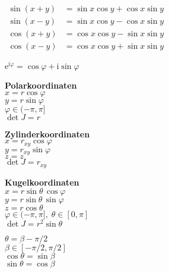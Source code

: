 \documentclass[a4paper,10pt,fleqn,twocolumn,twoside,openany]{book}
\numberwithin{equation}{chapter}
\newcommand{\strong}[1]{{\sffamily\bfseries #1}}
\theoremstyle{Definition}
\newcommand{\ui}{\mathrm i}
\newcommand{\ee}{\mathrm e}
\begin{document}
\noindent
$\!\begin{aligned}
\sin(x+y) &= \sin x\cos y + \cos x\sin y\\
\sin(x-y) &= \sin x\cos y - \cos x\sin y\\
\cos(x+y) &= \cos x\cos y - \sin x\sin y\\
\cos(x-y) &= \cos x\cos y + \sin x\sin y
\end{aligned}$
\vspace{1em}

\noindent
$\ee^{\ui\varphi}=\cos\varphi+\ui\sin\varphi$
\vspace{2em}

\noindent
\strong{Polarkoordinaten}\\
$x=r\cos\varphi$\\
$y=r\sin\varphi$\\
$\varphi\in(-\pi,\pi]$\\
$\det J=r$
\vspace{1em}

\noindent
\strong{Zylinderkoordinaten}\\
$x=r_{xy}\cos\varphi$\\
$y=r_{xy}\sin\varphi$\\
$z=z$\\
$\det J=r_{xy}$
\vspace{1em}

\noindent
\strong{Kugelkoordinaten}\\
$x=r\sin\theta\,\cos\varphi$\\
$y=r\sin\theta\,\sin\varphi$\\
$z=r\cos\theta$\\
$\varphi\in(-\pi,\pi],\;\theta\in[0,\pi]$\\
$\det J=r^2\sin\theta$
\vspace{1em}

\noindent
$\theta=\beta-\pi/2$\\
$\beta\in[-\pi/2,\pi/2]$\\
$\cos\theta=\sin\beta$\\
$\sin\theta=\cos\beta$

\renewcommand{\contentsname}{\sffamily Inhaltsverzeichnis}
\tableofcontents













\printindex
\end{document}
